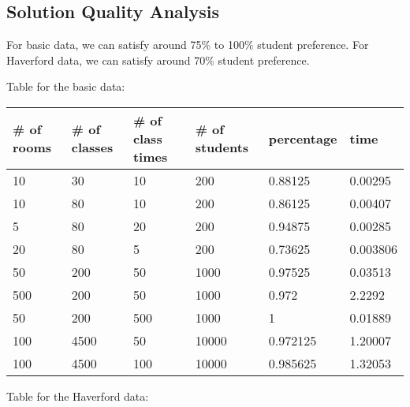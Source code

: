 \documentclass[11pt, oneside]{article}   	%
\begin{document}
\subsection{Solution Quality Analysis}
For basic data, we can satisfy around 75\% to 100\% student preference. For Haverford data, we can satisfy around 70\% student preference.

Table for the basic data:
\begin{table}[h]
\begin{tabular}{|l|l|l|l|l|l|}
\hline
\# of rooms & \# of classes & \# of class times & \# of students & percentage & time     \\ \hline
10          & 30            & 10                & 200            & 0.88125    & 0.00295  \\ \hline
10          & 80            & 10                & 200            & 0.86125    & 0.00407  \\ \hline
5           & 80            & 20                & 200            & 0.94875    & 0.00285  \\ \hline
20          & 80            & 5                 & 200            & 0.73625    & 0.003806 \\ \hline
50          & 200           & 50                & 1000           & 0.97525    & 0.03513  \\ \hline
500         & 200           & 50                & 1000           & 0.972      & 2.2292   \\ \hline
50          & 200           & 500               & 1000           & 1          & 0.01889  \\ \hline
100         & 4500          & 50                & 10000          & 0.972125   & 1.20007  \\ \hline
100         & 4500          & 100               & 10000          & 0.985625   & 1.32053  \\ \hline
\end{tabular}
\end{table}

Table for the Haverford data:


\end{document}
